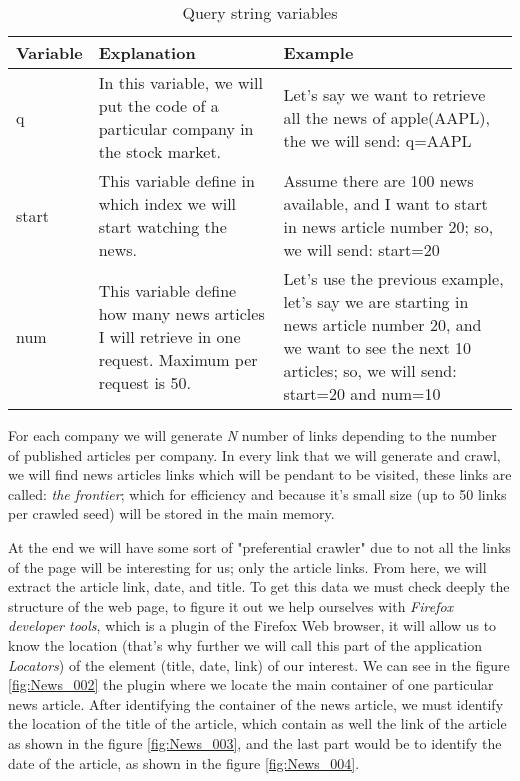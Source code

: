 \begin{table}\centering
	\caption{Query string variables}\label{tab:query-string}
   	\begin{tabular}{ | l | p{4cm\textwidth} | p{6cm\textwidth} |}
   	\hline
   	\textbf{Variable}  & \textbf{Explanation} & \textbf{Example}  \\ \hline
    	q & 
	In this variable, we will put the code of a particular company in the stock market.  & 
	Let's say we want to retrieve all the news of apple(AAPL), the we will send: q=AAPL\\ \hline
	start & 
	This variable define in which index we will start watching the news.  & 
	Assume there are 100 news available, and I want to start in news article number 20; so, we will send: start=20 \\ \hline
	num & 
	This variable define how many news articles I will retrieve in one request. Maximum per request is 50. &
	Let's use the previous example, let's say we are starting in news article number 20, and we want to see the next 10 articles; so, we will send: start=20 and num=10 \\ \hline
    \end{tabular}
\end{table}

For each company we will generate \textit{N} number of links depending to the number of published articles per company. In every link that we will generate and crawl, we will find news articles links which will be pendant to be visited, these links are called:  \textit{the frontier}; which for efficiency and because it's small size (up to 50 links per crawled seed) will be stored in the main memory.

At the end we will have some sort of "preferential crawler"  \cite[p. 314]{L2011} due to not all the links of the page will be interesting for us; only the article links. From here, we will extract the article link, date, and title. To get this data we must check deeply the structure of the web page, to figure it out we help ourselves with \emph{Firefox developer tools}, which is a plugin of the Firefox Web browser, it will allow us to know the location (that's why further we will call this part of the application \emph{Locators}) of the element (title, date, link) of our interest. We can see in the figure \ref{fig:News_002} the plugin where we locate the main container of one particular news article. After identifying the container of the news article, we must identify the location of the title of the article, which contain as well the link of the article as shown in the figure \ref{fig:News_003}, and the last part would be to identify the date of the article, as shown in the figure \ref{fig:News_004}. 

